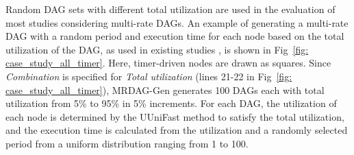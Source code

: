Random DAG sets with different total utilization are used in the evaluation of most studies considering multi-rate DAGs.
An example of generating a multi-rate DAG with a random period and execution time for each node based on the total utilization of the DAG, as used in existing studies \cite{he2021response, gunzel2021suspension, ueter2021hard}, is shown in Fig~\ref{fig: case_study_all_timer}.
Here, timer-driven nodes are drawn as squares.
Since {\it Combination} is specified for {\it Total utilization} (lines 21-22 in Fig~\ref{fig: case_study_all_timer}), MRDAG-Gen generates 100 DAGs each with total utilization from 5\% to 95\% in 5\% increments.
For each DAG, the utilization of each node is determined by the UUniFast method to satisfy the total utilization, and the execution time is calculated from the utilization and a randomly selected period from a uniform distribution ranging from 1 to 100.


